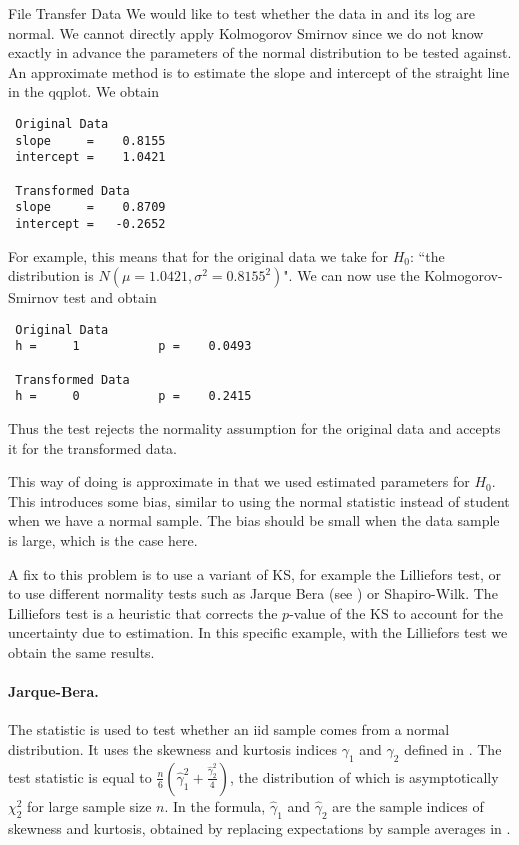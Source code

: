 \begin{ex}{File Transfer Data}
We would like to test whether the data in  and its
log are normal. We cannot directly apply Kolmogorov Smirnov since
we do not know exactly in advance the parameters of the normal
distribution to be tested against. An approximate method is to
estimate the slope and intercept of the straight line in the qqplot. We obtain {\footnotesize
 \begin{verbatim}
 Original Data
 slope     =    0.8155
 intercept =    1.0421

 Transformed Data
 slope     =    0.8709
 intercept =   -0.2652
 \end{verbatim}
}For example, this means that for the original data we take for
$H_0$: ``the distribution is $N(\mu=1.0421, \sigma^2=0.8155^2)$".
We can now use the Kolmogorov-Smirnov test and obtain
{\footnotesize
 \begin{verbatim}
 Original Data
 h =     1           p =    0.0493

 Transformed Data
 h =     0           p =    0.2415
 \end{verbatim}
}

Thus the test rejects the normality assumption for the original
data and accepts it for the transformed data.

This way of doing is approximate in that we used estimated
parameters for $H_0$. This introduces some bias, similar to using
the normal statistic instead of student when we have a normal
sample. The bias should be small when the data sample is large,
which is the case here.

A fix to this problem is to use a variant of KS, for example
the Lilliefors test, or to use different normality tests such
as Jarque Bera (see ) or
Shapiro-Wilk. The Lilliefors test
is a heuristic that corrects the $p$-value of the KS to account
for the uncertainty due to estimation. In this specific
example, with the Lilliefors test we obtain the same results.
\end{ex}
\begin{figure}
\center {}%
\end{figure}

\paragraph{Jarque-Bera.}
 The  statistic is used to test whether an iid sample comes from a normal
 distribution. It uses the skewness and kurtosis indices $\gamma_1$ and $\gamma_2$ defined in .
 The test statistic is equal to $\frac{n}{6}\left(\hat{\gamma}_1^2 +
 \frac{\hat{\gamma}_2^2}{4}\right)$, the distribution of which is asymptotically $\chi^2_2$ for
 large sample size $n$. In the formula, $\hat{\gamma}_1$ and $\hat{\gamma}_2$ are the sample
 indices of skewness and kurtosis, obtained by replacing expectations by sample averages in
 .


